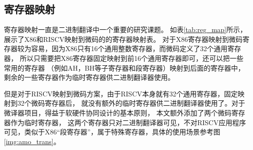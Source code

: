 \subsection{寄存器映射}

寄存器映射一直是二进制翻译中一个重要的研究课题。
如表\ref{tab:reg_map}所示，展示了X86和RISCV映射到微码的的寄存器映射表。
对于X86寄存器映射到微码寄存器较为容易，因为X86只有16个通用整数寄存器，而微码定义了32个通用寄存器，
所以只需要把X86寄存器固定映射到前16个通用寄存器即可，还可以把一些常用的寄存器
（例如AH，BH等子寄存器和段寄存器）映射到后面的寄存器中，剩余的一些寄存器作为临时寄存器供二进制翻译器使用。

但是对于RISCV映射到微码方案，由于RISCV本身就有32个通用寄存器，固定映射到32个微码寄存器后，
就没有额外的临时寄存器供二进制翻译器使用了。对于微译器项目，得益于软硬件协同设计的基本原则，
本文额外添加了两个微码寄存器作为临时寄存器，
这两个寄存器只对二进制翻译器可见，不对RISCV应用程序可见，类似于X86“段寄存器”，属于特殊寄存器，具体的使用场景参考图\ref{img:amo_trans}。



